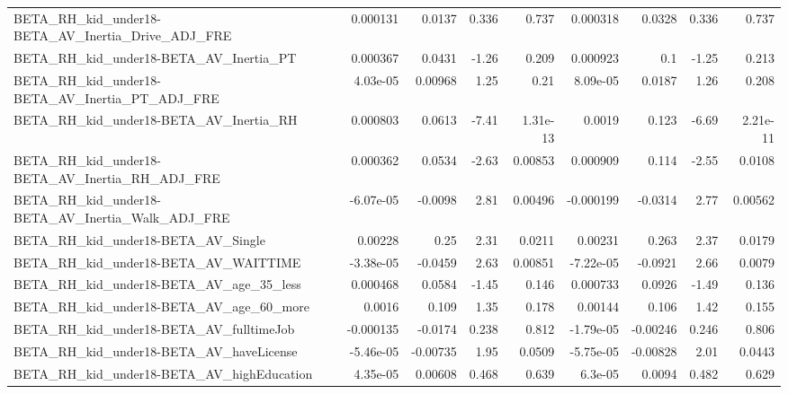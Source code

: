 \begin{tabular}{lrrrrrrrr}
BETA\_RH\_kid\_under18-BETA\_AV\_Inertia\_Drive\_ADJ\_FRE  &    0.000131 &       0.0137 &    0.336 &    0.737 &   0.000318 &      0.0328 &        0.336 &         0.737 \\
BETA\_RH\_kid\_under18-BETA\_AV\_Inertia\_PT             &    0.000367 &       0.0431 &    -1.26 &    0.209 &   0.000923 &         0.1 &        -1.25 &         0.213 \\
BETA\_RH\_kid\_under18-BETA\_AV\_Inertia\_PT\_ADJ\_FRE     &    4.03e-05 &      0.00968 &     1.25 &     0.21 &   8.09e-05 &      0.0187 &         1.26 &         0.208 \\
BETA\_RH\_kid\_under18-BETA\_AV\_Inertia\_RH             &    0.000803 &       0.0613 &    -7.41 & 1.31e-13 &     0.0019 &       0.123 &        -6.69 &      2.21e-11 \\
BETA\_RH\_kid\_under18-BETA\_AV\_Inertia\_RH\_ADJ\_FRE     &    0.000362 &       0.0534 &    -2.63 &  0.00853 &   0.000909 &       0.114 &        -2.55 &        0.0108 \\
BETA\_RH\_kid\_under18-BETA\_AV\_Inertia\_Walk\_ADJ\_FRE   &   -6.07e-05 &      -0.0098 &     2.81 &  0.00496 &  -0.000199 &     -0.0314 &         2.77 &       0.00562 \\
BETA\_RH\_kid\_under18-BETA\_AV\_Single                 &     0.00228 &         0.25 &     2.31 &   0.0211 &    0.00231 &       0.263 &         2.37 &        0.0179 \\
BETA\_RH\_kid\_under18-BETA\_AV\_WAITTIME               &   -3.38e-05 &      -0.0459 &     2.63 &  0.00851 &  -7.22e-05 &     -0.0921 &         2.66 &        0.0079 \\
BETA\_RH\_kid\_under18-BETA\_AV\_age\_35\_less            &    0.000468 &       0.0584 &    -1.45 &    0.146 &   0.000733 &      0.0926 &        -1.49 &         0.136 \\
BETA\_RH\_kid\_under18-BETA\_AV\_age\_60\_more            &      0.0016 &        0.109 &     1.35 &    0.178 &    0.00144 &       0.106 &         1.42 &         0.155 \\
BETA\_RH\_kid\_under18-BETA\_AV\_fulltimeJob            &   -0.000135 &      -0.0174 &    0.238 &    0.812 &  -1.79e-05 &    -0.00246 &        0.246 &         0.806 \\
BETA\_RH\_kid\_under18-BETA\_AV\_haveLicense            &   -5.46e-05 &     -0.00735 &     1.95 &   0.0509 &  -5.75e-05 &    -0.00828 &         2.01 &        0.0443 \\
BETA\_RH\_kid\_under18-BETA\_AV\_highEducation          &    4.35e-05 &      0.00608 &    0.468 &    0.639 &    6.3e-05 &      0.0094 &        0.482 &         0.629 \\

\end{tabular}
